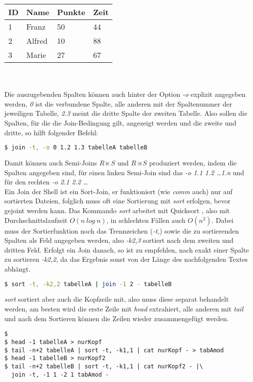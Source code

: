 \hspace{3cm}
\begin{tabular}{p{1cm}|p{3cm}|p{1.2cm}|p{1cm}}
\hline
ID & Name & Punkte & Zeit	 \\ \hline
1 & Franz & 50 & 44       \\ \hline
2 & Alfred & 10  & 88       \\\hline
3 & Marie & 27 & 67       \\\hline
\end{tabular}
\\\\
Die auszugebenden Spalten können auch hinter der Option \textit{-o} explizit angegeben werden, \textit{0} ist die verbundene Spalte, alle anderen mit der Spaltenummer der jeweiligen Tabelle, \textit{2.3} meint die dritte Spalte der zweiten Tabelle.
Also sollen die Spalten, für die die Join-Bedingung gilt, angezeigt werden und die zweite und dritte, so hilft folgender Befehl:
\begin{lstlisting}[language=Bash]
$ join -t, -o 0 1.2 1.3 tabelleA tabelleB
\end{lstlisting}
Damit können auch Semi-Joins $ R \ltimes S $ und $ R \rtimes S $ produziert werden, indem die Spalten angegeben sind, für einen linken Semi-Join sind das \textit{-o 1.1 1.2 \dots 1.n} und  für den rechten \textit{-o 2.1 2.2 \dots}\\

Ein Join der Shell ist ein Sort-Join, er funktioniert (wie \textit{comm} auch) nur auf sortierten Dateien, folglich muss oft eine Sortierung mit \textit{sort} erfolgen, bevor gejoint werden kann. Das Kommando \textit{sort} arbeitet mit Quicksort \cite{Prince}, also mit Durchschnittslaufzeit $O(n\ log\ n)$, in schlechten Fällen auch $O(n^2)$. Dabei muss der Sortierfunktion noch das Trennzeichen (\textit{-t,}) sowie die zu sortierenden Spalten als Feld angegeben werden, also \textit{-k2,3} sortiert nach dem zweiten und dritten Feld. Erfolgt ein Join danach, so ist zu empfehlen, nach exakt einer Spalte zu sortieren \textit{-k2,2}, da das Ergebnis sonst von der Länge des nachfolgenden Textes abhängt. 
\begin{lstlisting}[language=Bash]
$ sort -t, -k2,2 tabelleA | join -1 2 - tabelleB
\end{lstlisting}
\textit{sort} sortiert aber auch die Kopfzeile mit, also muss diese separat behandelt werden, am besten wird die erste Zeile mit \textit{head} extrahiert, alle anderen mit \textit{tail} und nach dem Sortieren können die Zeilen wieder zusammengefügt werden.
\begin{lstlisting}$
$ head -1 tabelleA > nurKopf
$ tail -n+2 tabelleA | sort -t, -k1,1 | cat nurKopf - > tabAmod
$ head -1 tabelleB > nurKopf2
$ tail -n+2 tabelleB | sort -t, -k1,1 | cat nurKopf2 - |\
  join -t, -1 1 -2 1 tabAmod - 
\end{lstlisting}

